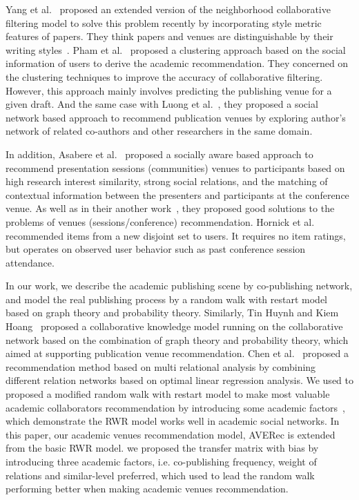 \documentclass[9pt]{acm_proc_article-sp}
\begin{document}
Yang et al.~\cite{yang2012venue} proposed an extended version of the neighborhood collaborative filtering model to solve this problem recently by incorporating style metric features of papers. They think papers and venues are distinguishable by their writing styles~\cite{yang2012distinguishing}. Pham et al.~\cite{pham2011clustering} proposed a clustering approach based on the social information of users to derive the academic recommendation. They concerned on the clustering techniques to improve the accuracy of collaborative filtering. However, this approach mainly involves predicting the publishing venue for a given draft. And the same case with Luong et al.~\cite{luong2012publication}, they proposed a social network based approach to recommend publication venues by exploring author's network of related co-authors and other researchers in the same domain.

In addition, Asabere et al.~\cite{asabere2014improving} proposed a socially aware based approach to recommend presentation sessions (communities) venues to participants based on high research interest similarity, strong social relations, and the matching of contextual information between the presenters and participants at the conference venue. As well as in their another work~\cite{xia2013socially}, they proposed good solutions to the problems of venues (sessions/conference) recommendation. Hornick et al.~\cite{hornick2012extending} recommended items from a new disjoint set to users. It requires no item ratings, but operates on observed user behavior such as past conference session attendance.

In our work, we describe the academic publishing scene by co-publishing network, and model the real publishing process by a random walk with restart model based on graph theory and probability theory. Similarly, Tin Huynh and Kiem Hoang~\cite{huynh2012modeling} proposed a collaborative knowledge model running on the collaborative network based on the combination of graph theory and probability theory, which aimed at supporting publication venue recommendation. Chen et al.~\cite{chen2012social} proposed a recommendation method based on multi relational analysis by combining different relation networks based on optimal linear regression analysis. We used to proposed a modified random walk with restart model to make most valuable academic collaborators recommendation by introducing some academic factors~\cite{xia2014mvcwalker,li2014acrec}, which demonstrate the RWR model works well in academic social networks. In this paper, our academic venues recommendation model, AVERec is extended from the basic RWR model. we proposed the transfer matrix with bias by introducing three academic factors, i.e. co-publishing frequency, weight of relations and similar-level preferred, which used to lead the random walk performing better when making academic venues recommendation.
\end{document}
